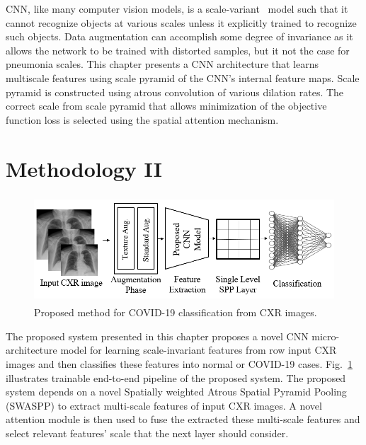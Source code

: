 



CNN, like many computer vision models, is a scale-variant~\cite{van2017learning} model such that it cannot recognize objects at various scales unless it explicitly trained to recognize such objects. Data augmentation can accomplish some degree of invariance as it allows the network to be trained with distorted samples, but it not the case for pneumonia scales. This chapter presents a CNN architecture that learns multiscale features using scale pyramid of the  CNN's internal feature maps. Scale pyramid is constructed using atrous convolution of various dilation rates. The correct scale from scale pyramid that allows minimization of the objective function loss is selected using the spatial attention mechanism. 
\section{Methodology II} 

\begin{center}
    \begin{figure}[htbp]
    \centerline{\includegraphics[height=40mm,width=15cm]{Figures/ProposedPipe.png}}
    \caption{Proposed method for COVID-19 classification from CXR images.}\label{ProposedPipe}\end{figure}\end{center}
    
The proposed system presented in this chapter proposes a novel CNN micro-architecture model for learning scale-invariant features from row input CXR images and then classifies these features into normal or COVID-19 cases. Fig.~\ref{ProposedPipe} illustrates trainable end-to-end pipeline of the proposed system. The proposed system depends on a novel Spatially weighted Atrous Spatial Pyramid Pooling (SWASPP) to extract multi-scale features of input CXR images. A novel attention module is then used to fuse the extracted these multi-scale features and select relevant features' scale that the next layer should consider.
